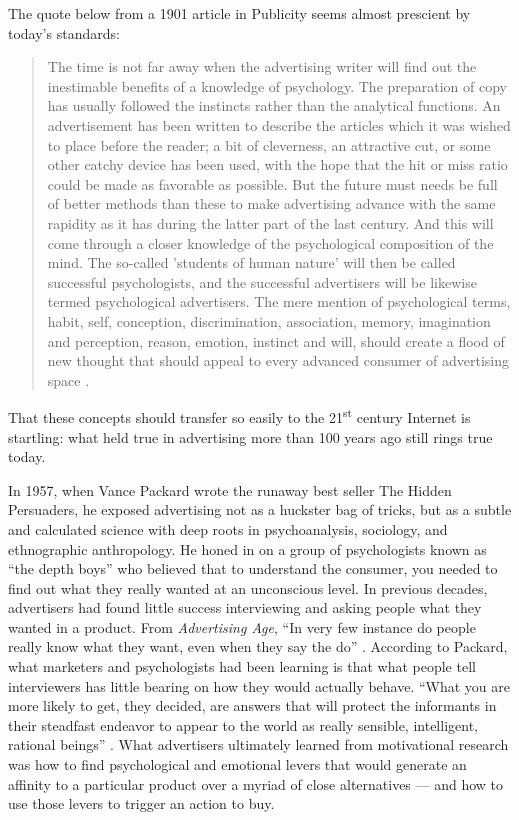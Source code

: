 The quote below from a 1901 article in Publicity seems almost prescient by today's standards:


\begin{quote}
The time is not far away when the advertising writer will find out the inestimable benefits of a knowledge of psychology. The preparation of copy has usually followed the instincts rather than the analytical functions. An advertisement has been written to describe the articles which it was wished to place before the reader; a bit of cleverness, an attractive cut, or some other catchy device has been used, with the hope that the hit or miss ratio could be made as favorable as possible. But the future must needs be full of better methods than these to make advertising advance with the same rapidity as it has during the latter part of the last century. And this will come through a closer knowledge of the psychological composition of the mind. The so-called 'students of human nature' will then be called successful psychologists, and the successful advertisers will be likewise termed psychological advertisers. The mere mention of psychological terms, habit, self, conception, discrimination, association, memory, imagination and perception, reason, emotion, instinct and will, should create a flood of new thought that should appeal to every advanced consumer of advertising space \citep[as cited in][]{Scott:1904td}.
\end{quote}


That these concepts should transfer so easily to the  21\textsuperscript{st}  century Internet is startling: what held true in advertising more than 100 years ago still rings true today.

In 1957, when Vance Packard wrote the runaway best seller The Hidden Persuaders, he exposed advertising not as a huckster bag of tricks, but as a subtle and calculated science with deep roots in psychoanalysis, sociology, and ethnographic anthropology. He honed in on a group of psychologists known as ``the depth boys'' who believed that to understand the consumer, you needed to find out what they really wanted at an unconscious level. In previous decades, advertisers had found little success interviewing and asking people what they wanted in a product. From \emph{Advertising Age}, ``In very few instance do people really know what they want, even when they say the do''  \citep[as cited in][p. 37]{Packard:1957vs}.  According to Packard, what marketers and psychologists had been learning is that what people tell interviewers has little bearing on how they would actually behave. ``What you are more likely to get, they decided, are answers that will protect the informants in their steadfast endeavor to appear to the world as really sensible, intelligent, rational beings''  \citep[p. 35]{Packard:1957vs}.  What advertisers ultimately learned from motivational research was how to find psychological and emotional levers that would generate an affinity to a particular product over a myriad of close alternatives --- and how to use those levers to trigger an action to buy.

